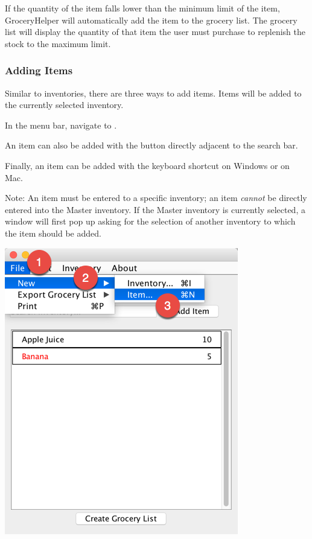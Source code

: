 \documentclass[letterpaper,12pt]{article}
\renewenvironment{enumerate}[1]{\begin{compactenum}#1}{\end{compactenum}}
\begin{document}
If the quantity of the item falls lower than the minimum limit of the item, GroceryHelper will automatically add the item to the grocery list. The grocery list will display the quantity of that item the user must purchase to replenish the stock to the maximum limit.

	\subsubsection{Adding Items}
Similar to inventories, there are three ways to add items. Items will be added to the currently selected inventory.

\begin{enumerate}
\item In the menu bar, navigate to .
\item An item can also be added with the  button directly adjacent to the search bar. 
\item Finally, an item can be added with the keyboard shortcut  on Windows or  on Mac.


\end{enumerate}


Note: An item must be entered to a specific inventory; an item \textit{cannot} be directly entered into the Master inventory. If the Master inventory is currently selected, a window will first pop up asking for the selection of another inventory to which the item should be added.\\



\centerline{\includegraphics[scale=0.5]{10.png}}
\end{document}
